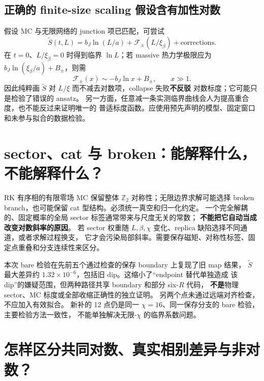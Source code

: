 \documentclass[11pt]{article}
\newcommand{\tS}{\widetilde S}
\newcommand{\xb}{\xi_\beta}
\begin{document}
\subsection{正确的 finite-size scaling 假设含有加性对数}
假设 MC 与无限网络的 junction 项已匹配，可尝试
\begin{equation}
 \tS(t,L)=b_J\ln(L/a)+\mathcal F_\pm(L/\xb)
                 +\text{corrections}.\label{eq:fss}
\end{equation}
在 $t=0$、$L/\xb=0$ 时得到临界 $\ln L$；若 massive 热力学极限应为
$b_J\ln(\xb/a)+B_\pm$，则需
\begin{equation}
 \mathcal F_\pm(x)\sim-b_J\ln x+B_\pm,\qquad x\gg1.
\end{equation}
因此纯粹画 $\tS$ 对 $L/\xi$ 而不减去对数项，collapse 失败\textbf{不反驳}
对数标度；它可能只是检验了错误的 ansatz。
另一方面，任意减一条实测临界曲线会人为提高重合度，也不能反过来证明唯一的
普适标度函数。应使用预先声明的模型、固定窗口和未参与拟合的数据检验。

\section{sector、cat 与 broken：能解释什么，不能解释什么？}
RK 有序相的有限零场 MC 保留整体 $\mathbb Z_2$ 对称性；无限边界求解可能选择
broken branch，也可能保留 cat 型结构。必须统一真空和归一化约定。
一个完全解耦的、固定概率的全局 sector 标签通常带来与尺度无关的常数；
\textbf{不能把它自动当成改变对数斜率的原因}。
若 sector 权重随 $L,\beta,\chi$ 变化、replica 缺陷选择不同通道，或者求解过程换支，
它才会污染局部斜率。需要保存磁矩、对称性标签、固定点重叠和分支连续性来区分。

本次 bare 检验在先前五个通过检查的保存 boundary 上复现了旧 map 结果，
$\tS$ 最大差异约 $1.32\times10^{-6}$，包括旧 dip。这缩小了“endpoint 替代单独造成
该 dip”的嫌疑范围，但两种路径共享 boundary 和部分 six-$R$ 代码，
\textbf{不是}物理 sector、MC 标度或全部收缩正确性的独立证明。
另两个点未通过远端对齐检查，不应加入有效拟合。
新补的 12 点仍是同一 $\chi=16$、同一保存分支的 bare 检验，主要检验方法一致性，
不能单独解决无限-$\chi$ 的临界系数问题。

\section{怎样区分共同对数、真实相别差异与非对数？}
\end{document}
